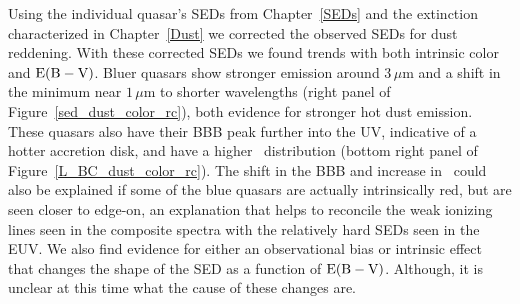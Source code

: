 Using the individual quasar's SEDs from Chapter~\ref{SEDs} and the extinction characterized in Chapter~\ref{Dust} we corrected the observed SEDs for dust reddening.  With these corrected SEDs we found trends with both intrinsic color and ${\rm E(B-V)}$.  Bluer quasars show stronger emission around $3\,\mu$m and a shift in the minimum near $1\,\mu$m to shorter wavelengths (right panel of Figure~\ref{sed_dust_color_rc}), both evidence for stronger hot dust emission. These quasars also have their BBB peak further into the UV, indicative of a hotter accretion disk, and have a higher \bctwofive\ distribution (bottom right panel of Figure~\ref{L_BC_dust_color_rc}).  The shift in the BBB and increase in \bctwofive\ could also 
be explained if some of the blue quasars are actually intrinsically red, but are seen closer to edge-on, an explanation that helps to reconcile the weak ionizing lines seen in the composite spectra with the relatively hard SEDs seen in the EUV.
We also find evidence for either an observational bias or intrinsic effect that changes the shape of the SED as a function of ${\rm E(B-V)}$.  Although, it is unclear at this time what the cause of these changes are.

